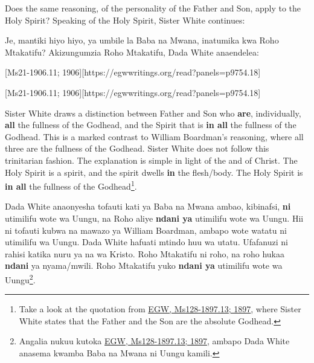 Does the same reasoning, of the personality of the Father and Son, apply to the Holy Spirit? Speaking of the Holy Spirit, Sister White continues:


Je, mantiki hiyo hiyo, ya umbile la Baba na Mwana, inatumika kwa Roho Mtakatifu? Akizungumzia Roho Mtakatifu, Dada White anaendelea:


[Ms21-1906.11; 1906][https://egwwritings.org/read?panels=p9754.18]


[Ms21-1906.11; 1906][https://egwwritings.org/read?panels=p9754.18]


Sister White draws a distinction between Father and Son who \textbf{are}, individually, \textbf{all} the fullness of the Godhead, and the Spirit that is \textbf{in all} the fullness of the Godhead. This is a marked contrast to William Boardman’s reasoning, where all three are the fullness of the Godhead. Sister White does not follow this trinitarian fashion. The explanation is simple in light of the  and of Christ. The Holy Spirit is a spirit, and the spirit dwells \textbf{in} the flesh/body. The Holy Spirit is \textbf{in all} the fullness of the Godhead\footnote{Take a look at the quotation from \href{https://egwwritings.org/?ref=en_Ms128-1897.13&para=5426.19}{{EGW, Ms128-1897.13; 1897}}, where Sister White states that the Father and the Son are the absolute Godhead.}.


Dada White anaonyesha tofauti kati ya Baba na Mwana ambao, kibinafsi, \textbf{ni} utimilifu wote wa Uungu, na Roho aliye \textbf{ndani ya} utimilifu wote wa Uungu. Hii ni tofauti kubwa na mawazo ya William Boardman, ambapo wote watatu ni utimilifu wa Uungu. Dada White hafuati mtindo huu wa utatu. Ufafanuzi ni rahisi katika nuru ya  na wa Kristo. Roho Mtakatifu ni roho, na roho hukaa \textbf{ndani} ya nyama/mwili. Roho Mtakatifu yuko \textbf{ndani ya} utimilifu wote wa Uungu\footnote{Angalia nukuu kutoka \href{https://egwwritings.org/?ref=en_Ms128-1897.13&para=5426.19}{{EGW, Ms128-1897.13; 1897}}, ambapo Dada White anasema kwamba Baba na Mwana ni Uungu kamili.}.


